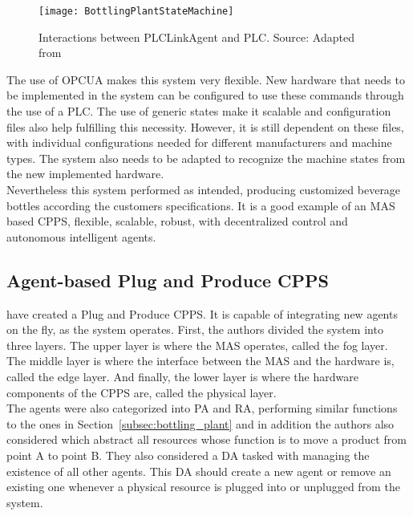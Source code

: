\begin{figure}[H]
	\centering
	\texttt{[image: BottlingPlantStateMachine]}
	\caption{Interactions between PLCLinkAgent and \acrshort{PLC}. Source: Adapted from \cite{bottling_plant_part2}}
	\label{fig:bottling_plant_state_achine}
\end{figure}

The use of \acrshort{OPCUA} makes this system very flexible. New hardware that needs to be implemented in the system can be configured to use these commands through the use of a \acrshort{PLC}. The use of generic states make it scalable and configuration files also help fulfilling this necessity. However, it is still dependent on these files, with individual configurations needed for different manufacturers and machine types. The system also needs to be adapted to recognize the machine states from the new implemented hardware.\\

Nevertheless this system performed as intended, producing customized beverage bottles according the customers specifications. It is a good example of an \acrshort{MAS} based \acrshort{CPPS}, flexible, scalable, robust, with decentralized control and autonomous intelligent agents.
 
\subsection{Agent-based Plug and Produce CPPS}
\label{agent_plug_and_produce}

\citeauthor{8972169} \cite{8972169} have created a Plug and Produce \acrshort{CPPS}. It is capable of integrating new agents on the fly, as the system operates. First, the authors divided the system into three layers. The upper layer is where the \acrshort{MAS} operates, called the fog layer. The middle layer is where the interface between the \acrshort{MAS} and the hardware is, called the edge layer. And finally, the lower layer is where the hardware components of the \acrshort{CPPS} are, called the physical layer.\\

The agents were also categorized into \acrshort{PA} and \acrshort{RA}, performing similar functions to the ones in Section~\ref{subsec:bottling_plant} and in addition the authors also considered  which abstract all resources whose function is to move a product from point A to point B. They also considered a \acrfull{DA} tasked with managing the existence of all other agents. This \acrshort{DA} should create a new agent or remove an existing one whenever a physical resource is plugged into or unplugged from the system.\\

